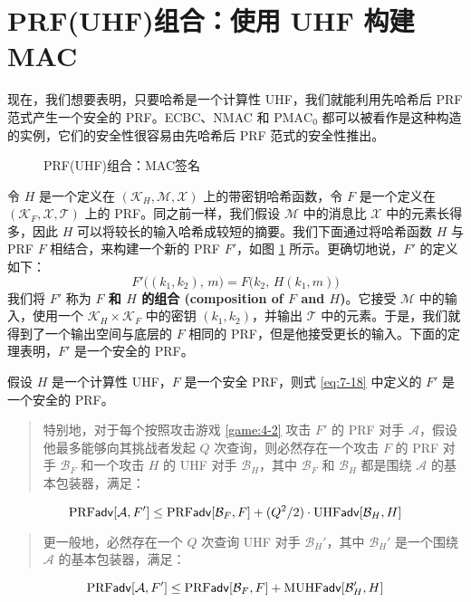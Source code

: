 \section{PRF(UHF)组合：使用 UHF 构建 MAC}

现在，我们想要表明，只要哈希是一个计算性 UHF，我们就能利用先哈希后 PRF 范式产生一个安全的 PRF。ECBC、NMAC 和 $\mathrm{PMAC}_0$ 都可以被看作是这种构造的实例，它们的安全性很容易由先哈希后 PRF 范式的安全性推出。

\begin{figure}
  \centering
  
  \caption{PRF(UHF)组合：MAC签名}
  \label{fig:7-3}
\end{figure}

令 $H$ 是一个定义在 $(\mathcal{K}_H,\mathcal{M},\mathcal{X})$ 上的带密钥哈希函数，令 $F$ 是一个定义在 $(\mathcal{K}_F,\mathcal{X},\mathcal{T})$ 上的 PRF。同之前一样，我们假设 $\mathcal{M}$ 中的消息比 $\mathcal{X}$ 中的元素长得多，因此 $H$ 可以将较长的输入哈希成较短的摘要。我们下面通过将哈希函数 $H$ 与 PRF $F$ 相结合，来构建一个新的 PRF $F'$，如图 \ref{fig:7-3} 所示。更确切地说，$F'$ 的定义如下：
\begin{equation}\label{eq:7-18}
F'\big((k_1,k_2),\,m\big)=F\big(k_2,\,H(k_1,m)\big)
\end{equation}
我们将 $F'$ 称为 \textbf{$F$ 和 $H$ 的组合 (composition of $F$ and $H$)}。它接受 $\mathcal{M}$ 中的输入，使用一个 $\mathcal{K}_H\times\mathcal{K}_F$ 中的密钥 $(k_1,k_2)$，并输出 $\mathcal{T}$ 中的元素。于是，我们就得到了一个输出空间与底层的 $F$ 相同的 PRF，但是他接受更长的输入。下面的定理表明，$F'$ 是一个安全的 PRF。

\begin{theorem}\label{theo:7-7}
假设 $H$ 是一个计算性 UHF，$F$ 是一个安全 PRF，则式 \ref{eq:7-18} 中定义的 $F'$ 是一个安全的 PRF。
\begin{quote}
特别地，对于每个按照攻击游戏 \ref{game:4-2} 攻击 $F'$ 的 PRF 对手 $\mathcal{A}$，假设他最多能够向其挑战者发起 $Q$ 次查询，则必然存在一个攻击 $F$ 的 PRF 对手 $\mathcal{B}_F$ 和一个攻击 $H$ 的 UHF 对手 $\mathcal{B}_H$，其中 $\mathcal{B}_F$ 和 $\mathcal{B}_H$ 都是围绕 $\mathcal{A}$ 的基本包装器，满足：
\end{quote}
\begin{equation}\label{eq:7-19}
{\rm PRF}\mathsf{adv}[\mathcal{A},F']\leq{\rm PRF}\mathsf{adv}[\mathcal{B}_F,F]+{(Q^2/2)}\cdot{\rm UHF}\mathsf{adv}[\mathcal{B}_H,H]
\end{equation}
\begin{quote}
更一般地，必然存在一个 $Q$ 次查询 UHF 对手 $\mathcal{B}_H'$，其中 $\mathcal{B}_H'$ 是一个围绕 $\mathcal{A}$ 的基本包装器，满足：
\end{quote}
\begin{equation}\label{eq:7-20}
{\rm PRF}\mathsf{adv}[\mathcal{A},F']\leq{\rm PRF}\mathsf{adv}[\mathcal{B}_F,F]+{\rm MUHF}\mathsf{adv}[\mathcal{B}_H',H]
\end{equation}
\end{theorem}

